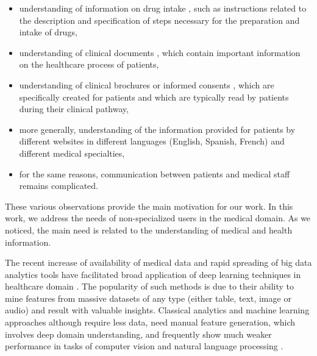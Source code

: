 \begin{itemize}
    \item  understanding of information on drug intake \citep{VanderStichele-WILEY1999, Patel-IJMI2002}, such as instructions related to the description and specification of steps necessary for the preparation and intake of drugs,
    
    \item  understanding of clinical documents \citep{Zeng-MEDINFO2007}, which contain important information on the healthcare process of patients,
    
    \item  understanding of clinical brochures or informed consents \citep{Williams-JAMA1995}, which are specifically created for patients and which are typically read by patients during their clinical pathway,
    
    \item  more generally, understanding of the information provided for patients by different websites \citep{Oregon-2008, Brigo-EB2015} in different languages (English, Spanish, French) and different medical specialties,
    
    \item for the same reasons, communication between patients and medical staff \citep{Jucks-HC2007, Tran-EC2009} remains complicated.
\end{itemize}
These various observations provide the main motivation for our work. In this work, we address the needs of non-specialized users in the medical domain. As we noticed, the main need is related to the understanding of medical and health information. 

The recent increase of availability of medical data and rapid spreading of big data analytics tools have facilitated broad application of deep learning techniques in healthcare domain \citep{Jiang-BMJ2017}. The popularity of such methods is due to their ability to mine features from massive datasets of any type (either table, text, image or audio) and result with valuable insights. Classical analytics and machine learning approaches although require less data, need manual feature generation, which involves deep domain understanding, and frequently show much weaker performance in tasks of computer vision and natural language processing \citep{Krizhevsky-NIPS2012, Zhang-NIPS2015}.   

